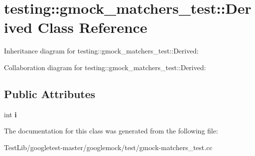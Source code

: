 \hypertarget{classtesting_1_1gmock__matchers__test_1_1Derived}{}\section{testing\+:\+:gmock\+\_\+matchers\+\_\+test\+:\+:Derived Class Reference}
\label{classtesting_1_1gmock__matchers__test_1_1Derived}


Inheritance diagram for testing\+:\+:gmock\+\_\+matchers\+\_\+test\+:\+:Derived\+:


Collaboration diagram for testing\+:\+:gmock\+\_\+matchers\+\_\+test\+:\+:Derived\+:
\subsection*{Public Attributes}
\begin{DoxyCompactItemize}
\item 
\mbox{\label{classtesting_1_1gmock__matchers__test_1_1Derived_a357d6747c44d7af7159fb5898a782f1b}} 
int {\bfseries i}
\end{DoxyCompactItemize}


The documentation for this class was generated from the following file\+:\begin{DoxyCompactItemize}
\item 
Test\+Lib/googletest-\/master/googlemock/test/gmock-\/matchers\+\_\+test.\+cc\end{DoxyCompactItemize}
